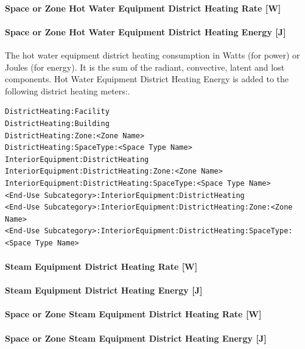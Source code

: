 \paragraph{Space or Zone Hot Water Equipment District Heating Rate {[}W{]}}\label{zone-hot-water-equipment-district-heating-rate-w}

\paragraph{Space or Zone Hot Water Equipment District Heating Energy {[}J{]}}\label{zone-hot-water-equipment-district-heating-energy-j}

The hot water equipment district heating consumption in Watts (for power) or Joules (for energy). It is the sum of the radiant, convective, latent and lost components. Hot Water Equipment District Heating Energy is added to the following district heating meters:.

\begin{lstlisting}
DistrictHeating:Facility
DistrictHeating:Building
DistrictHeating:Zone:<Zone Name>
DistrictHeating:SpaceType:<Space Type Name>
InteriorEquipment:DistrictHeating
InteriorEquipment:DistrictHeating:Zone:<Zone Name>
InteriorEquipment:DistrictHeating:SpaceType:<Space Type Name>
<End-Use Subcategory>:InteriorEquipment:DistrictHeating
<End-Use Subcategory>:InteriorEquipment:DistrictHeating:Zone:<Zone Name>
<End-Use Subcategory>:InteriorEquipment:DistrictHeating:SpaceType:<Space Type Name>
\end{lstlisting}

\paragraph{Steam Equipment District Heating Rate {[}W{]}}\label{steam-equipment-district-heating-rate-w}

\paragraph{Steam Equipment District Heating Energy {[}J{]}}\label{steam-equipment-district-heating-energy-j}

\paragraph{Space or Zone Steam Equipment District Heating Rate {[}W{]}}\label{zone-steam-equipment-district-heating-rate-w}

\paragraph{Space or Zone Steam Equipment District Heating Energy {[}J{]}}\label{zone-steam-equipment-district-heating-energy-j}

